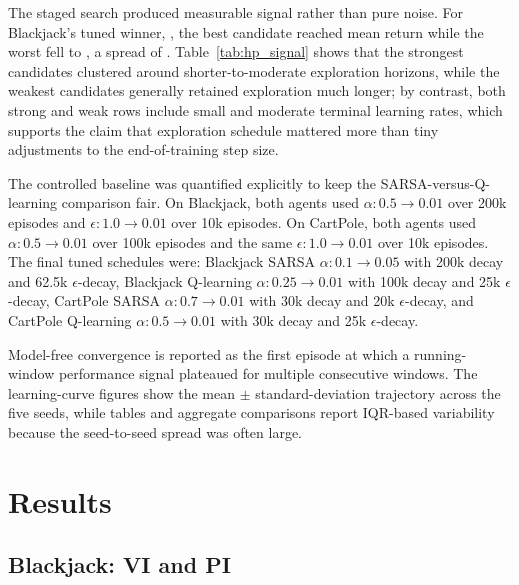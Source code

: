 \documentclass[letterpaper, 10 pt, conference]{ieeeconf}
\begin{document}
The staged search produced measurable signal rather than pure noise. For Blackjack's tuned winner, \HPAlgo, the best candidate reached mean return \HPBestMetric while the worst fell to \HPWorstMetric, a spread of \HPSignalSpread. Table~\ref{tab:hp_signal} shows that the strongest candidates clustered around shorter-to-moderate exploration horizons, while the weakest candidates generally retained exploration much longer; by contrast, both strong and weak rows include small and moderate terminal learning rates, which supports the claim that exploration schedule mattered more than tiny adjustments to the end-of-training step size.

\begin{table}[t]
\caption{Blackjack HP-search signal for the tuned winner. Top-3 and bottom-3 candidates for \HPAlgo show that the validation sweep materially affected final return.}
\label{tab:hp_signal}
\centering
\resizebox{\columnwidth}{!}{}
\end{table}

The controlled baseline was quantified explicitly to keep the SARSA-versus-Q-learning comparison fair. On Blackjack, both agents used $\alpha: 0.5 \rightarrow 0.01$ over 200k episodes and $\epsilon: 1.0 \rightarrow 0.01$ over 10k episodes. On CartPole, both agents used $\alpha: 0.5 \rightarrow 0.01$ over 100k episodes and the same $\epsilon: 1.0 \rightarrow 0.01$ over 10k episodes. The final tuned schedules were: Blackjack SARSA $\alpha: 0.1 \rightarrow 0.05$ with 200k decay and 62.5k $\epsilon$-decay, Blackjack Q-learning $\alpha: 0.25 \rightarrow 0.01$ with 100k decay and 25k $\epsilon$-decay, CartPole SARSA $\alpha: 0.7 \rightarrow 0.01$ with 30k decay and 20k $\epsilon$-decay, and CartPole Q-learning $\alpha: 0.5 \rightarrow 0.01$ with 30k decay and 25k $\epsilon$-decay.

Model-free convergence is reported as the first episode at which a running-window performance signal plateaued for multiple consecutive windows. The learning-curve figures show the mean $\pm$ standard-deviation trajectory across the five seeds, while tables and aggregate comparisons report IQR-based variability because the seed-to-seed spread was often large.

\section{Results}

\subsection{Blackjack: VI and PI}
\end{document}
